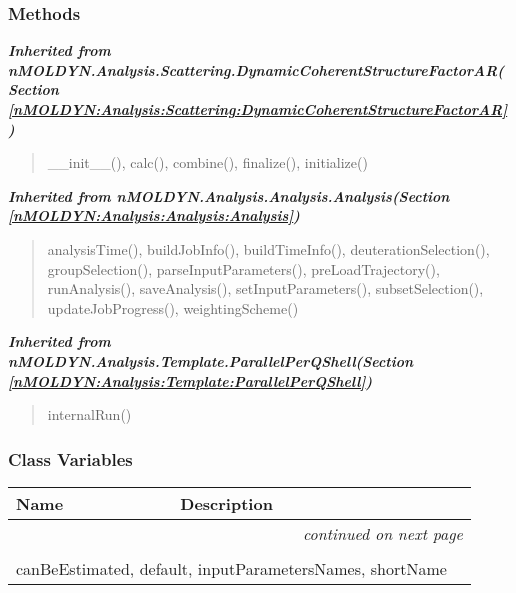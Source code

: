 
  \subsubsection{Methods}


\large{\textbf{\textit{Inherited from nMOLDYN.Analysis.Scattering.DynamicCoherentStructureFactorAR\textit{(Section \ref{nMOLDYN:Analysis:Scattering:DynamicCoherentStructureFactorAR})}}}}

\begin{quote}
\_\_init\_\_(), calc(), combine(), finalize(), initialize()
\end{quote}

\large{\textbf{\textit{Inherited from nMOLDYN.Analysis.Analysis.Analysis\textit{(Section \ref{nMOLDYN:Analysis:Analysis:Analysis})}}}}

\begin{quote}
analysisTime(), buildJobInfo(), buildTimeInfo(), deuterationSelection(), groupSelection(), parseInputParameters(), preLoadTrajectory(), runAnalysis(), saveAnalysis(), setInputParameters(), subsetSelection(), updateJobProgress(), weightingScheme()
\end{quote}

\large{\textbf{\textit{Inherited from nMOLDYN.Analysis.Template.ParallelPerQShell\textit{(Section \ref{nMOLDYN:Analysis:Template:ParallelPerQShell})}}}}

\begin{quote}
internalRun()
\end{quote}


  \subsubsection{Class Variables}

    \vspace{-1cm}
\hspace{\varindent}\begin{longtable}{|p{\varnamewidth}|p{\vardescrwidth}|l}
\cline{1-2}
\cline{1-2} \centering \textbf{Name} & \centering \textbf{Description}& \\
\cline{1-2}
\endhead\cline{1-2}\multicolumn{3}{r}{\small\textit{continued on next page}}\\\endfoot\cline{1-2}
\endlastfoot\multicolumn{2}{|l|}{\textit{Inherited from nMOLDYN.Analysis.Scattering.DynamicCoherentStructureFactorAR \textit{(Section \ref{nMOLDYN:Analysis:Scattering:DynamicCoherentStructureFactorAR})}}}\\
\multicolumn{2}{|p{\varwidth}|}{\raggedright canBeEstimated, default, inputParametersNames, shortName}\\
\cline{1-2}
\end{longtable}

